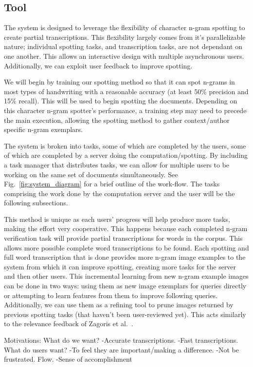 \documentclass[ms]{byuprop}
\begin{document}
\subsection{Tool}
The system is designed to leverage the flexibility of character n-gram spotting to create partial transcriptions. This flexibility largely comes from it's parallelizable nature; individual spotting tasks, and transcription tasks, are not dependant on one another. This allows an interactive design with multiple asynchronous users. Additionally, we can exploit user feedback to improve spotting.

We will begin by training our spotting method so that it can spot n-grams in most types of handwriting with a reasonable accuracy (at least 50\% precision and 15\% recall). This will be used to begin spotting the documents. Depending on this character n-gram spotter's performance, a training step may need to precede the main execution, allowing the spotting method to gather context/author specific n-gram exemplars. 

The system is broken into tasks, some of which are completed by the users, some of which are completed by a server doing the computation/spotting. By including a task manager that distributes tasks, we can allow for multiple users to be working on the same set of documents simultaneously. See Fig.~\ref{fig:system_diagram} for a brief outline of the work-flow. The tasks comprising the work done by the computation server and the user will be the following subsections.

This method is unique as each users' progress will help produce more tasks, making the effort very cooperative. This happens because each completed n-gram verification task will provide partial transcriptions for words in the corpus. This allows more possible complete word transcriptions to be found. Each spotting and full word transcription that is done provides more n-gram image examples to the system from which it can improve spotting, creating more tasks for the server and then other users. This incremental learning from new n-gram example images can be done in two ways: using them as new image exemplars for queries directly or attempting to learn features from them to improve following queries. Additionally, we can use them as a refining tool to prune images returned by previous spotting tasks (that haven't been user-reviewed yet). This acts similarly to the relevance feedback of Zagoris et al.~\cite{Zagoris2015}.

Motivations:
What do we want?
-Accurate transcriptions.
-Fast transcriptions.
What do users want?
-To feel they are important/making a difference.
-Not be frustrated. Flow.
-Sense of accomplishment
\end{document}
